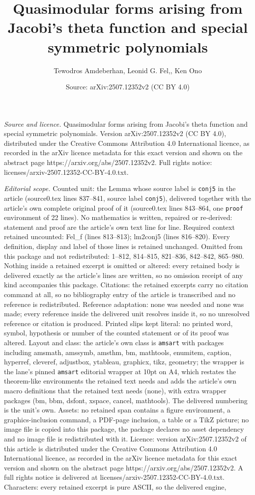 \documentclass[10pt,a4paper]{amsart}
\title[Quasimodular forms arising from Jacobi's theta function and ]{Quasimodular forms arising from Jacobi's theta function and special symmetric polynomials}
\author{Tewodros Amdeberhan, Leonid G. Fel,, Ken Ono}
\date{Source: arXiv:2507.12352v2 (CC BY 4.0)}
\begin{document}
\maketitle

\noindent\emph{Source and licence.} Quasimodular forms arising from Jacobi's theta function and special symmetric polynomials. Version arXiv:2507.12352v2 (CC BY 4.0), distributed under the Creative Commons Attribution 4.0 International licence, as recorded in the arXiv licence metadata for this exact version and shown on the abstract page https://arxiv.org/abs/2507.12352v2. Full rights notice: licenses/arxiv-2507.12352-CC-BY-4.0.txt.\par\smallskip

\noindent\textit{Editorial scope.} Counted unit: the Lemma whose source label is \texttt{conj5} in the article (source0.tex lines 837--841, source label \texttt{conj5}), delivered together with the article's own complete original proof of it (source0.tex lines 843--864, one \texttt{proof} environment of 22 lines). No mathematics is written, repaired or re-derived: statement and proof are the article's own text line for line. Required context retained uncounted: Fel\_f (lines 813--813); lm2conj5 (lines 816--820). Every definition, display and label of those lines is retained unchanged. Omitted from this package and not redistributed: 1--812, 814--815, 821--836, 842--842, 865--980. Nothing inside a retained excerpt is omitted or altered: every retained body is delivered exactly as the article's lines are written, so no omission receipt of any kind accompanies this package. Citations: the retained excerpts carry no citation command at all, so no bibliography entry of the article is transcribed and no reference is redistributed. Reference adaptation: none was needed and none was made; every reference inside the delivered unit resolves inside it, so no unresolved reference or citation is produced. Printed slips kept literal: no printed word, symbol, hypothesis or number of the counted statement or of its proof was altered. Layout and class: the article's own class is \texttt{amsart} with packages including amsmath, amssymb, amsthm, bm, mathtools, enumitem, caption, hyperref, cleveref, adjustbox, ytableau, graphicx, tikz, geometry; the wrapper is the lane's pinned \texttt{amsart} editorial wrapper at 10pt on A4, which restates the theorem-like environments the retained text needs and adds the article's own macro definitions that the retained text needs (none), with extra wrapper packages (bm, bbm, dsfont, xspace, cancel, mathtools). The delivered numbering is the unit's own. Assets: no retained span contains a figure environment, a graphics-inclusion command, a PDF-page inclusion, a table or a TikZ picture; no image file is copied into this package, the package declares no asset dependency and no image file is redistributed with it. Licence: version arXiv:2507.12352v2 of this article is distributed under the Creative Commons Attribution 4.0 International licence, as recorded in the arXiv licence metadata for this exact version and shown on the abstract page https://arxiv.org/abs/2507.12352v2. A full rights notice is delivered at licenses/arxiv-2507.12352-CC-BY-4.0.txt. Characters: every retained excerpt is pure ASCII, so the delivered engine, 
\end{document}
